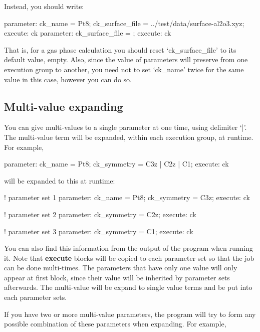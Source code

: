 \documentclass[11pt]{book}
\begin{document}
Instead, you should write:

\begin{everbatim}
{ parameter: 
   ck_name = Pt8;
   ck_surface_file = ../test/data/surface-al2o3.xyz;
}
{ execute: ck }
{ parameter: 
   ck_surface_file = ;
}
{ execute: ck }
\end{everbatim}

That is, for a gas phase calculation you should reset `ck\_surface\_file' to its default value, empty. 
Also, since the value of parameters will preserve from one execution group to another, you need not to set `ck\_name'
twice for the same value in this case, however you can do so.

\subsection{Multi-value expanding}\label{mve}

You can give multi-values to a single parameter at one time, using delimiter `|'. The multi-value term will be expanded, 
within each execution group, at runtime. For example, 

\begin{everbatim}
{ parameter: 
   ck_name = Pt8;
   ck_symmetry = C3z | C2z | C1;
}
{ execute: ck }
\end{everbatim}

will be expanded to this at runtime:

\begin{everbatim}

! parameter set 1
  { parameter: 
   ck_name = Pt8;
   ck_symmetry = C3z;
  }
  { execute: ck }
  
! parameter set 2
  { parameter:
   ck_symmetry = C2z;
  }
  { execute: ck }
    
! parameter set 3
  { parameter:
   ck_symmetry = C1;
  }
  { execute: ck }
\end{everbatim}

You can also find this information from the output of the program when running it. Note that \textbf{execute} blocks will be copied 
to each parameter set so that the job can be done multi-times. The parameters that have only one value will only appear at first 
block, since their value will be inherited by parameter sets afterwards. The multi-value will be expand to single value terms and 
be put into each parameter sets.

If you have two or more multi-value parameters, the program will try to form any possible combination of these parameters when expanding. 
For example,
\end{document}
